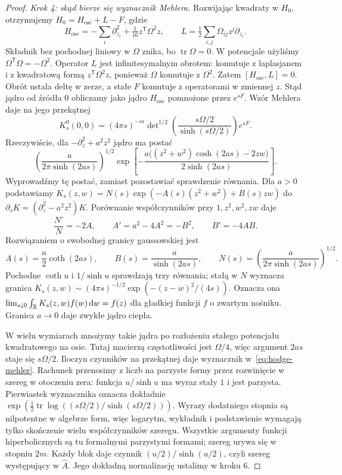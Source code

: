 \begin{proof}
\emph{Krok 4: skąd bierze się wyznacznik Mehlera.}
Rozwijając kwadraty w $H_0$, otrzymujemy
$H_0=H_{\mathrm{osc}}+L-F$, gdzie
\[
 H_{\mathrm{osc}}=-\sum_i\partial_{z_i}^2
                    +\tfrac1{16}z^{\mathsf T}\Omega^2z,
 \qquad
 L=\tfrac12\sum_{i,j}\Omega_{ij}z^j\partial_{z_i}.
\]
Składnik bez pochodnej liniowy w $\Omega$ znika,
bo $\operatorname{tr}\Omega=0$.
W potencjale użyliśmy $\Omega^{\mathsf T}\Omega=-\Omega^2$.
Operator $L$ jest infinitesymalnym obrotem:
komutuje z laplasjanem i z kwadratową formą
$z^{\mathsf T}\Omega^2z$, ponieważ $\Omega$ komutuje z $\Omega^2$.
Zatem $[H_{\mathrm{osc}},L]=0$.
Obrót ustala deltę w zerze, a stałe $F$ komutuje
z operatorami w zmiennej $z$.
Stąd jądro od źródła $0$ obliczamy jako jądro
$H_{\mathrm{osc}}$ pomnożone przez $e^{sF}$.
Wzór Mehlera daje na jego przekątnej
\begin{equation}\label{eq:hodge-mehler}
 K^0_s(0,0)
 =(4\pi s)^{-m}
 \det\nolimits^{1/2}
 \left(\frac{s\Omega/2}{\sinh(s\Omega/2)}\right)
 e^{sF}.
\end{equation}
Rzeczywiście, dla
\(-\partial_z^2+a^2z^2\) jądro ma postać
\[
 \left(\frac{a}{2\pi\sinh(2as)}\right)^{1/2}
 \exp\!\left[
  -\frac{a\bigl((z^2+w^2)\cosh(2as)-2zw\bigr)}
         {2\sinh(2as)}
 \right].
\]
Wyprowadźmy tę postać, zamiast pozostawiać sprawdzenie równania.
Dla $a>0$ podstawiamy
$K_s(z,w)=N(s)\exp(-A(s)(z^2+w^2)+B(s)zw)$
do $\partial_sK=(\partial_z^2-a^2z^2)K$.
Porównanie współczynników przy $1,z^2,w^2,zw$ daje
\[
 \frac{N'}N=-2A,\qquad
 A'=a^2-4A^2=-B^2,\qquad B'=-4AB.
\]
Rozwiązaniem o swobodnej granicy gaussowskiej jest
\[
 A(s)=\frac a2\coth(2as),\qquad
 B(s)=\frac{a}{\sinh(2as)},\qquad
 N(s)=\left(\frac{a}{2\pi\sinh(2as)}\right)^{1/2}.
\]
Pochodne $\coth u$ i $1/\sinh u$ sprawdzają trzy równania;
stałą w $N$ wyznacza granica
$K_s(z,w)\sim(4\pi s)^{-1/2}\exp(-(z-w)^2/(4s))$.
Oznacza ona
$\lim_{s\downarrow0}\int_{\mathbb{R}} K_s(z,w)f(w)\,\mathrm d w=f(z)$
dla gładkiej funkcji $f$ o zwartym nośniku.
Granica $a\to0$ daje zwykłe jądro ciepła.

W wielu wymiarach mnożymy takie jądra po rozłożeniu
stałego potencjału kwadratowego na osie.
Tutaj macierzą częstotliwości jest $\Omega/4$,
więc argument $2as$ staje się $s\Omega/2$.
Iloczyn czynników na przekątnej daje wyznacznik
w~\eqref{eq:hodge-mehler}.
Rachunek przenosimy z liczb na parzyste formy przez
rozwinięcie w szereg w otoczeniu zera:
funkcja $u/\sinh u$ ma wyraz stały $1$ i jest parzysta.
Pierwiastek wyznacznika oznacza dokładnie
$\exp(\frac12\operatorname{tr}\log((s\Omega/2)/\sinh(s\Omega/2)))$.
Wyrazy dodatniego stopnia są nilpotentne w algebrze form,
więc logarytm, wykładnik i podstawienie wymagają tylko
skończenie wielu współczynników szeregu.
Wszystkie argumenty funkcji hiperbolicznych są
tu formalnymi parzystymi formami; szereg urywa
się w stopniu \(2m\). Każdy blok daje czynnik
\((u/2)/\sinh(u/2)\), czyli szereg występujący w
$\widehat A$. Jego dokładną normalizację ustalimy w kroku 6.


\end{proof}

